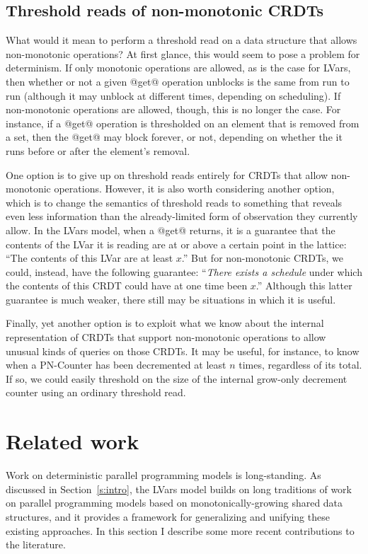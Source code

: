 \documentclass{article}
\begin{document}
\subsection{Threshold reads of non-monotonic CRDTs}

What would it mean to perform a threshold read on a data structure
that allows non-monotonic operations?  At first glance, this would
seem to pose a problem for determinism. If only monotonic operations
are allowed, as is the case for LVars, then whether or not a given
@get@ operation unblocks is the same from run to run (although it may
unblock at different times, depending on scheduling).  If
non-monotonic operations are allowed, though, this is no longer the
case. For instance, if a @get@ operation is thresholded on an element
that is removed from a set, then the @get@ may block forever, or not,
depending on whether the it runs before or after the element's
removal.

One option is to give up on threshold reads entirely for CRDTs that
allow non-monotonic operations.  However, it is also worth considering
another option, which is to change the semantics of threshold reads to
something that reveals even less information than the already-limited
form of observation they currently allow. In the LVars model, when a
@get@ returns, it is a guarantee that the contents of the LVar it is
reading are at or above a certain point in the lattice: ``The contents
of this LVar are at least $x$.''  But for non-monotonic CRDTs, we
could, instead, have the following guarantee: ``\emph{There exists a
  schedule} under which the contents of this CRDT could have at one
time been $x$.''  Although this latter guarantee is much weaker, there
still may be situations in which it is useful.

Finally, yet another option is to exploit what we know about the
internal representation of CRDTs that support non-monotonic operations
to allow unusual kinds of queries on those CRDTs. It may be useful,
for instance, to know when a PN-Counter has been decremented at least
$n$ times, regardless of its total.  If so, we could easily threshold
on the size of the internal grow-only decrement counter using an
ordinary threshold read.

\section{Related work}\label{s:related}

Work on deterministic parallel programming models is long-standing.
As discussed in Section~\ref{s:intro}, the LVars model builds on long
traditions of work on parallel programming models based on
monotonically-growing shared data structures, and it provides a
framework for generalizing and unifying these existing approaches.  In
this section I describe some more recent contributions to the
literature.
\end{document}

